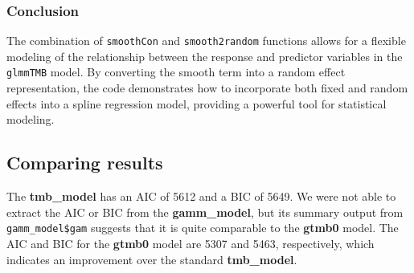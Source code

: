 \documentclass{article}
\begin{document}
\subsubsection{Conclusion}
The combination of \texttt{smoothCon} and \texttt{smooth2random} functions allows for a flexible modeling of the relationship between the response and predictor variables in the \texttt{glmmTMB} model. By converting the smooth term into a random effect representation, the code demonstrates how to incorporate both fixed and random effects into a spline regression model, providing a powerful tool for statistical modeling.

\subsection{Comparing results}

The \textbf{tmb\_model} has an AIC of 5612 and a BIC of 5649. We were not able to extract the AIC or BIC from the \textbf{gamm\_model}, but its summary output from \texttt{gamm\_model\$gam} suggests that it is quite comparable to the \textbf{gtmb0} model. The AIC and BIC for the \textbf{gtmb0} model are 5307 and 5463, respectively, which indicates an improvement over the standard \textbf{tmb\_model}.

\newpage
\end{document}
